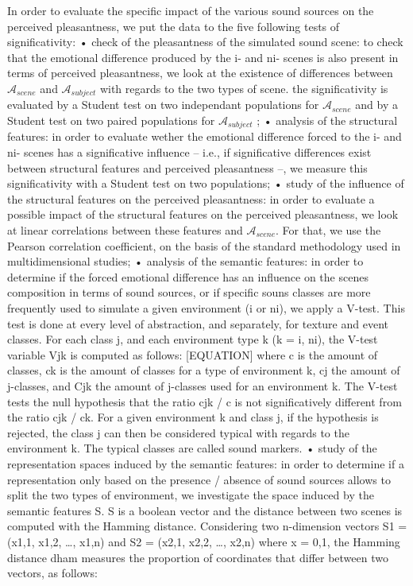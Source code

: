 In order to evaluate the specific impact of the various sound sources on the perceived pleasantness, we put the data to the five following tests of significativity: • check of the pleasantness of the simulated sound scene: to check that the emotional difference produced by the i- and ni- scenes is also present in terms of perceived pleasantness, we look at the existence of differences between $\mathcal{A}_{scene}$ and $\mathcal{A}_{subject}$ with regards to the two types of scene. the significativity is evaluated by a Student test on two independant populations for $\mathcal{A}_{scene}$ and by a Student test on two paired populations for $\mathcal{A}_{subject}$ ; • analysis of the structural features: in order to evaluate wether the emotional difference forced to the i- and ni- scenes has a significative influence – i.e., if significative differences exist between structural features and perceived pleasantness –, we measure this significativity with a Student test on two populations; • study of the influence of the structural features on the perceived pleasantness: in order to evaluate a possible impact of the structural features on the perceived pleasantness, we look at linear correlations between these features and $\mathcal{A}_{scene}$. For that, we use the Pearson correlation coefficient, on the basis of the standard methodology used in multidimensional studies; • analysis of the semantic features: in order to determine if the forced emotional difference has an influence on the scenes composition in terms of sound sources, or if specific souns classes are more frequently used to simulate a given environment (i or ni), we apply a V-test. This test is done at every level of abstraction, and separately, for texture and event classes. For each class j, and each environment type k (k = {i, ni}), the V-test variable Vjk is computed as follows:
[EQUATION]
where c is the amount of classes, ck is the amount of classes for a type of environment k, cj the amount of j-classes, and Cjk the amount of j-classes used for an environment k. The V-test tests the null hypothesis that the ratio cjk / c is not significatively different from the ratio cjk / ck. For a given environment k and class j, if the hypothesis is rejected, the class j can then be considered typical with regards to the environment k. The typical classes are called sound markers. • study of the representation spaces induced by the semantic features: in order to determine if a representation only based on the presence / absence of sound sources allows to split the two types of environment, we investigate the space induced by the semantic features S. S is a boolean vector and the distance between two scenes is computed with the Hamming distance. Considering two n-dimension vectors S1 = (x1,1, x1,2, …, x1,n) and S2 = (x2,1, x2,2, …, x2,n) where x = {0,1}, the Hamming distance dham measures the proportion of coordinates that differ between two vectors, as follows:
